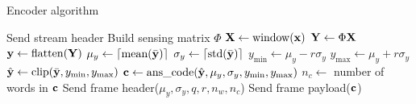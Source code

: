 \begin{algorithm}[H]
\caption{Encoder algorithm}
\label{alg:encoder}
\footnotesize
\SetAlgoLined
Send stream header \;
Build sensing matrix $\Phi$\;
 {
    $\mathbf{X} \leftarrow \mathrm{window}(\mathbf{x})$ \;
    $\mathbf{Y} \leftarrow \Phi \mathbf{X}$\;
    $\mathbf{y} \leftarrow \mathrm{flatten}(\mathbf{Y})$\;
    $\mu_y \leftarrow \left \lceil \text{mean}(\bar{\mathbf{y}}) \right \rceil$ \;
    $\sigma_y \leftarrow \left \lceil \text{std}(\bar{\mathbf{y}}) \right \rceil$ \;
     {
        $y_{\min} \leftarrow \mu_y  - r \sigma_y$ \;
        $y_{\max} \leftarrow \mu_y  + r \sigma_y$ \;
        $\hat{\mathbf{y}} \leftarrow \mathrm{clip}(\bar{\mathbf{y}}, y_{\min}, y_{\max})$\;
    }
    $\mathbf{c} \leftarrow \text{ans\_code}(\hat{\mathbf{y}}, \mu_y, \sigma_y, y_{\min}, y_{\max})$ \;
    $n_c \leftarrow$ number of words in $\mathbf{c}$\;
    Send frame header($\mu_y, \sigma_y, q, r, n_w, n_c$)\;
    Send frame payload($\mathbf{c}$)\;
}
\end{algorithm}
